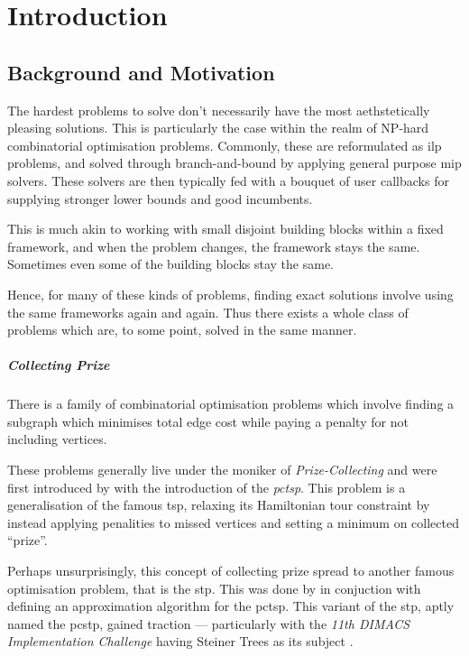 \chapter{Introduction}
\section{Background and Motivation}\label{sec:intro:background}
The hardest problems to solve don't necessarily have the most aethstetically pleasing solutions.
This is particularly the case within the realm of NP-hard combinatorial optimisation problems.
Commonly, these are reformulated as \gls{ilp} problems, and solved through
branch-and-bound
by applying general purpose
\gls{mip} solvers. These solvers are then typically
fed with a bouquet of user callbacks for supplying
stronger lower bounds and good incumbents.

This is much akin to working with small disjoint building blocks
within a fixed framework, and when the problem changes, the framework stays
the same. Sometimes even some of the building blocks stay the same.

Hence, for many of these kinds of problems, finding exact solutions
involve using the same frameworks again and again.
Thus there exists a whole class of problems which are, to some point,
solved in the same manner.

\paragraph{Collecting Prize}
There is a family of combinatorial optimisation problems which involve
finding a subgraph which minimises total edge cost while paying a penalty
for not including vertices.

These problems generally live under the moniker of \textit{Prize-Collecting}
and were first introduced by \citet*{balas1989prize}
with the introduction of the \textit{\gls{pctsp}}. This problem is a generalisation of
the famous \gls{tsp}, relaxing its Hamiltonian tour constraint by instead applying penalities
to missed vertices and setting a minimum on collected ``prize''.

Perhaps unsurprisingly, this concept of collecting prize spread to another famous optimisation
problem, that is the \gls{stp}. This was done by \citet{Bienstock1993} in conjuction with
defining an approximation algorithm for the \gls{pctsp}. This variant of the \gls{stp},
aptly named the \gls{pcstp}, gained traction --- particularly with the
\textit{11th DIMACS Implementation Challenge} having Steiner Trees as its subject
\citep{DIMACS}.

